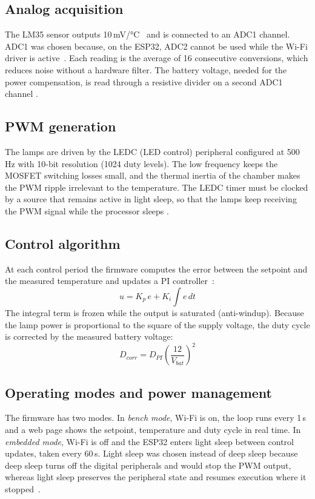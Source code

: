 \subsection{Analog acquisition}
The LM35 sensor outputs 10\,mV/°C~\cite{lm35} and is connected to an ADC1 channel. ADC1 was chosen
because, on the ESP32, ADC2 cannot be used while the Wi-Fi driver is active~\cite{esp32trm}. Each
reading is the average of 16 consecutive conversions, which reduces noise without a hardware
filter. The battery voltage, needed for the power compensation, is read through a resistive divider
on a second ADC1 channel .

\subsection{PWM generation}
The lamps are driven by the LEDC (LED control) peripheral configured at 500\,Hz with 10-bit
resolution (1024 duty levels). The low frequency keeps the MOSFET switching losses small, and the
thermal inertia of the chamber makes the PWM ripple irrelevant to the temperature. The LEDC timer
must be clocked by a source that remains active in light sleep, so that the lamps keep receiving the
PWM signal while the processor sleeps .

\subsection{Control algorithm}
At each control period the firmware computes the error between the setpoint and the measured
temperature and updates a PI controller~\cite{astrom1995}:
\begin{equation}
  u = K_p\,e + K_i \int e\,dt
  \label{eq:pi}
\end{equation}
The integral term is frozen while the output is saturated (anti-windup). Because the lamp power is
proportional to the square of the supply voltage, the duty cycle is corrected by the measured
battery voltage:
\begin{equation}
  D_{corr} = D_{PI}\left(\frac{12}{V_{bat}}\right)^{2}
  \label{eq:comp}
\end{equation}

\subsection{Operating modes and power management}
The firmware has two modes. In \emph{bench mode}, Wi-Fi is on, the loop runs every 1\,s and a web
page shows the setpoint, temperature and duty cycle in real time. In \emph{embedded mode}, Wi-Fi is
off and the ESP32 enters light sleep between control updates, taken every 60\,s. Light sleep was
chosen instead of deep sleep because deep sleep turns off the digital peripherals and would stop
the PWM output, whereas light sleep preserves the peripheral state and resumes execution where it
stopped~\cite{esp32trm}.

